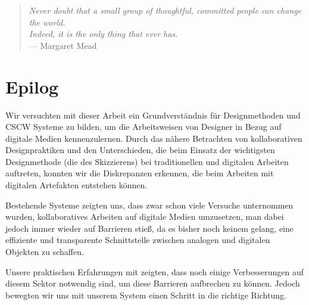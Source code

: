 \cleardoublepage
{}
\begin{quote}
	\begin{flushright}{\slshape    
	    Never doubt that a small group of thoughtful, committed people can change the world.\\
		Indeed, it is the only thing that ever has.} \\ \medskip
	    --- Margaret Mead \citep{Buxton:2007}
	\end{flushright}
\end{quote}
\pagestyle{empty}

\hfill

\vfill

\begingroup
\let\cleardoublepage\relax
\chapter*{Epilog}
Wir versuchten mit dieser Arbeit ein Grundverständnis für Designmethoden und \ac{CSCW} Systeme zu bilden, um die Arbeitsweisen von Designer in Bezug auf digitale Medien kennenzulernen. Durch das nähere Betrachten von kollaborativen Designpraktiken und den Unterschieden, die beim Einsatz der wichtigsten Designmethode (die des Skizzierens) bei traditionellen und digitalen Arbeiten auftreten, konnten wir die Diskrepanzen erkennen, die beim Arbeiten mit digitalen Artefakten entstehen können.

Bestehende Systeme zeigten uns, dass zwar schon viele Versuche unternommen wurden, kollaboratives Arbeiten auf digitale Medien umzusetzen, man dabei jedoch immer wieder auf Barrieren stieß, da es bisher noch keinem gelang, eine effiziente und transparente Schnittstelle zwischen analogen und digitalen Objekten zu schaffen. 

Unsere praktischen Erfahrungen mit \scribbler zeigten, dass noch einige Verbesserungen auf diesem Sektor notwendig sind, um diese Barrieren aufbrechen zu können. Jedoch bewegten wir uns mit unserem System einen Schritt in die richtige Richtung.
\endgroup